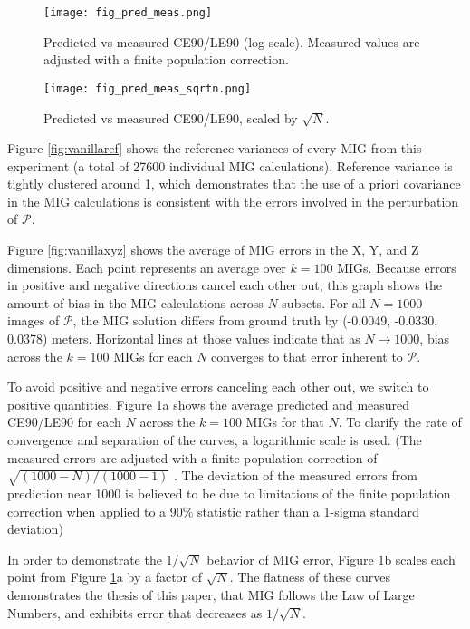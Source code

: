 \documentclass[10pt]{amsart}
\newcommand{\Pimg}{\mathcal{P}}
\begin{document}
\begin{figure}
\texttt{[image: fig\_pred\_meas.png]}
\caption{\label{fig:vanilla_pred_meas}Predicted vs measured CE90/LE90 (log
  scale). Measured values are adjusted with a finite population correction.}
\end{figure}

\begin{figure}
\texttt{[image: fig\_pred\_meas\_sqrtn.png]}
\caption{\label{fig:vanilla_pred_meas_sqrtn}Predicted vs measured CE90/LE90,
  scaled by $\sqrt{N}$.}
\end{figure}

Figure \ref{fig:vanillaref} shows the reference variances of every MIG from this
experiment (a total of 27600 individual MIG calculations). Reference variance is
tightly clustered around 1, which demonstrates that the use of a priori
covariance in the MIG calculations is consistent with the errors involved in the
perturbation of $\Pimg$.

Figure \ref{fig:vanillaxyz} shows the average of MIG errors in the X, Y, and Z
dimensions. Each point represents an average over $k=100$ MIGs. Because errors
in positive and negative directions cancel each other out, this graph shows the
amount of bias in the MIG calculations across $N$-subsets. For all $N=1000$
images of $\Pimg$, the MIG solution differs from ground truth by (-0.0049,
-0.0330, 0.0378) meters. Horizontal lines at those values indicate that as
$N\rightarrow 1000$, bias across the $k=100$ MIGs for each $N$ converges to that
error inherent to $\Pimg$.

To avoid positive and negative errors canceling each other out, we switch to
positive quantities. Figure \ref{fig:vanilla_pred_meas}a shows the average
predicted and measured CE90/LE90 for each $N$ across the $k=100$ MIGs for that
$N$. To clarify the rate of convergence and separation of the curves, a
logarithmic scale is used. (The measured errors are adjusted with a finite
population correction of $\sqrt{(1000-N)/(1000-1)}$ \cite{FPC}. The deviation of
the measured errors from prediction near 1000 is believed to be due to
limitations of the finite population correction when applied to a 90\% statistic
rather than a 1-sigma standard deviation)

In order to demonstrate the $1/\sqrt{N}$ behavior of MIG error, Figure
\ref{fig:vanilla_pred_meas}b scales each point from Figure
\ref{fig:vanilla_pred_meas}a by a factor of $\sqrt N$. The flatness of these
curves demonstrates the thesis of this paper, that MIG follows the Law of Large
Numbers, and exhibits error that decreases as $1/\sqrt N$.
\end{document}
